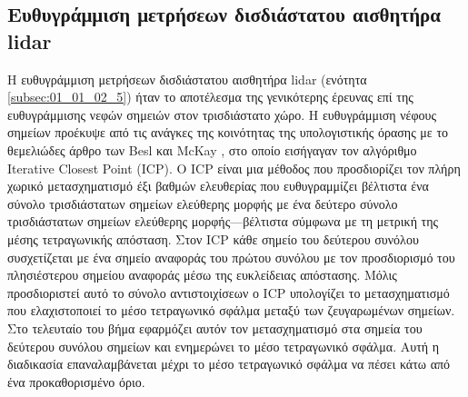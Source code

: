 \subsection{Ευθυγράμμιση μετρήσεων δισδιάστατου αισθητήρα lidar}
\label{subsection:02_02_02:1}

Η ευθυγράμμιση μετρήσεων δισδιάστατου αισθητήρα lidar (ενότητα
\ref{subsec:01_01_02_5}) ήταν το αποτέλεσμα της γενικότερης έρευνας επί της
ευθυγράμμισης νεφών σημειών στον τρισδιάστατο χώρο.  Η ευθυγράμμιση νέφους
σημείων προέκυψε από τις ανάγκες της κοινότητας της υπολογιστικής όρασης με το
θεμελιώδες άρθρο των Besl και McKay \cite{Besl1992c}, στο οποίο εισήγαγαν τον
αλγόριθμο Iterative Closest Point (ICP). Ο ICP είναι μια μέθοδος που
προσδιορίζει τον πλήρη χωρικό μετασχηματισμό έξι βαθμών ελευθερίας που
ευθυγραμμίζει βέλτιστα ένα σύνολο τρισδιάστατων σημείων ελεύθερης μορφής με ένα
δεύτερο σύνολο τρισδιάστατων σημείων ελεύθερης μορφής---βέλτιστα σύμφωνα με τη
μετρική της μέσης τετραγωνικής απόσταση. Στον ICP κάθε σημείο του δεύτερου
συνόλου συσχετίζεται με ένα σημείο αναφοράς του πρώτου συνόλου με τον
προσδιορισμό του πλησιέστερου σημείου αναφοράς μέσω της ευκλείδειας απόστασης.
Μόλις προσδιοριστεί αυτό το σύνολο αντιστοιχίσεων ο ICP υπολογίζει το
μετασχηματισμό που ελαχιστοποιεί το μέσο τετραγωνικό σφάλμα μεταξύ των
ζευγαρωμένων σημείων.  Στο τελευταίο του βήμα εφαρμόζει αυτόν τον
μετασχηματισμό στα σημεία του δεύτερου συνόλου σημείων και ενημερώνει το μέσο
τετραγωνικό σφάλμα. Αυτή η διαδικασία επαναλαμβάνεται μέχρι το μέσο τετραγωνικό
σφάλμα να πέσει κάτω από ένα προκαθορισμένο όριο.

